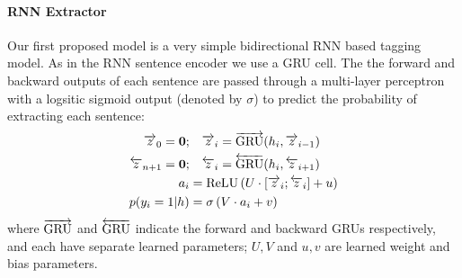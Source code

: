 \paragraph{RNN Extractor}{
    Our first proposed model is a very simple bidirectional
RNN based tagging model. As in the RNN sentence encoder we use a GRU cell.
The the forward and backward outputs of each sentence are passed through a 
multi-layer perceptron with a logsitic sigmoid output (denoted by $\sigma$)
to predict the probability
of extracting each sentence:
\begin{align}
    \rExtHidden_0 = \mathbf{0};&\quad   \rExtHidden_i = \rgru(\sentEmb[i], \rExtHidden_{i-1}) \\
    \lExtHidden_{\docSize + 1} = \mathbf{0};&\quad    \lExtHidden_i = \lgru(\sentEmb[i], \lExtHidden_{i+1}) \\
   \logits_i &= \relu\left(U \cdot [\rExtHidden_i; \lExtHidden_i] + u \right)\\
   p(\slabel_i=1|\sentvec) &= \sigma\left(V\cdot \logits_i + v  \right)
\end{align}
where $\overrightarrow{\operatorname{GRU}}$ and $\overleftarrow{\operatorname{GRU}}$ indicate the 
forward and backward GRUs respectively, and each have separate learned 
parameters; $U, V$ and $u, v$ are learned weight and bias parameters.

}
